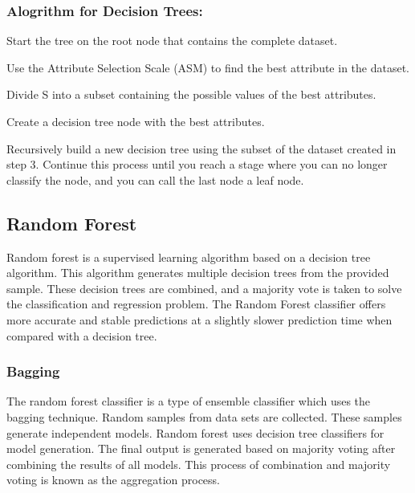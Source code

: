\subsubsection{Alogrithm for Decision Trees:}
\begin{steps}
  \vspace{-0.5em}
  \setlength{\itemsep}{-0.2em}
  \item Start the tree on the root node that contains the complete dataset.
  \item Use the Attribute Selection Scale (ASM) to find the best attribute in the dataset.
  \item Divide S into a subset containing the possible values of the best attributes.
  \item Create a decision tree node with the best attributes.
  \item Recursively build a new decision tree using the subset of the dataset created in step 3. Continue this process until you reach a stage where you can no longer classify the node,   and you can call the last node a leaf node.
  \vspace{-1em}
\end{steps}

\subsection{Random Forest} \label{subsec:random_forest}
Random forest is a supervised learning algorithm based on a decision tree algorithm. This algorithm generates multiple decision trees from the provided sample. These decision trees are combined, and a majority vote is taken to solve the classification and regression problem. The Random Forest classifier offers more accurate and stable predictions at a slightly slower prediction time when compared with a decision tree.

\subsubsection{Bagging}
\vspace{-0.5em}
The random forest classifier is a type of ensemble classifier which uses the bagging technique. Random samples from data sets are collected. These samples generate independent models. Random forest uses decision tree classifiers for model generation. The final output is generated based on majority voting after combining the results of all models. This process of combination and majority voting is known as the aggregation process.

